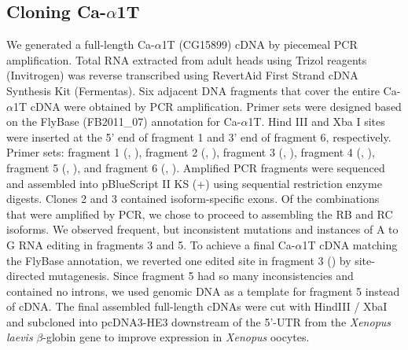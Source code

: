 \subsection*{Cloning Ca-$\alpha$1T}

We generated a full-length Ca-$\alpha$1T (CG15899) cDNA by piecemeal PCR amplification.
Total RNA extracted from adult heads using Trizol reagents (Invitrogen) was reverse transcribed using RevertAid First Strand cDNA Synthesis Kit (Fermentas).
Six adjacent DNA fragments that cover the entire Ca-$\alpha$1T cDNA were obtained by PCR amplification. 
Primer sets were designed based on the FlyBase (FB2011\_07) annotation for Ca-$\alpha$1T. 
Hind III and Xba I sites were inserted at the 5' end of fragment 1 and 3' end of fragment 6, respectively.
Primer sets: fragment 1 (, ), fragment 2 (, ), fragment 3 (, ), fragment 4 (, ), fragment 5 (, ), and fragment 6 (, ).
Amplified PCR fragments were sequenced and assembled into pBlueScript II KS (+) using sequential restriction enzyme digests.
Clones 2 and 3 contained isoform-specific exons.
Of the combinations that were amplified by PCR, we chose to proceed to assembling the RB and RC isoforms.
We observed frequent, but inconsistent mutations and instances of A to G RNA editing in fragments 3 and 5.
To achieve a final Ca-$\alpha$1T cDNA matching the FlyBase annotation, we reverted one edited site in fragment 3 () by site-directed mutagenesis.
Since fragment 5 had so many inconsistencies and contained no introns, we used genomic DNA as a template for fragment 5 instead of cDNA.
The final assembled full-length cDNAs were cut with HindIII / XbaI and subcloned into pcDNA3-HE3 downstream of the 5'-UTR from the \emph{Xenopus laevis} $\beta$-globin gene to improve expression in \emph{Xenopus} oocytes.
